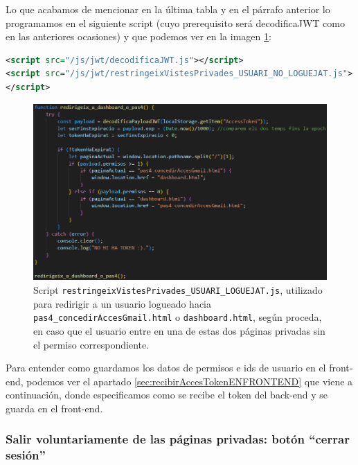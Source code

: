 \documentclass[a4paper,12pt]{report}
\begin{document}
	Lo que acabamos de mencionar en la última tabla y en el párrafo anterior lo programamos en el siguiente script (cuyo prerequisito será decodificaJWT como en las anteriores ocasiones) y que podemos ver en la imagen \ref{fig:restringeixVistesPrivadesUSUARINOLOGUEJAT}:
	
	
\begin{lstlisting}[language=xml, basicstyle=\ttfamily\footnotesize, keywordstyle=\color{magenta}]
<script src="/js/jwt/decodificaJWT.js"></script>
<script src="/js/jwt/restringeixVistesPrivades_USUARI_NO_LOGUEJAT.js">
</script>
\end{lstlisting} 
	
	
	\setlength{\abovecaptionskip}{15pt}
	\FloatBarrier
	\begin{figure}[H]
		\centering
		\caption{Script \texttt{restringeixVistesPrivades\_USUARI\_LOGUEJAT.js}, utilizado para redirigir a un usuario logueado hacia \texttt{pas4\_concedirAccesGmail.html} o \texttt{dashboard.html}, según proceda, en caso que el usuario entre en una de estas dos páginas privadas sin el permiso correspondiente.}
		\includegraphics[width=1\linewidth]{img/restringeixVistesPrivadesUSUARINOLOGUEJAT.png}
		
		\label{fig:restringeixVistesPrivadesUSUARINOLOGUEJAT}
	\end{figure}
	\FloatBarrier	
	
	
	
	Para entender como guardamos los datos de permisos e ids de usuario en el front-end, podemos ver el apartado \ref{sec:recibirAccesTokenENFRONTEND} que viene a continuación, donde especificamos como se recibe el token del back-end y se guarda en el front-end.
	
	\subsubsection{Salir voluntariamente de las páginas privadas: botón ``cerrar sesión''}
	\label{sec:tancarSessioBotoExplicacio}
	
\end{document}
